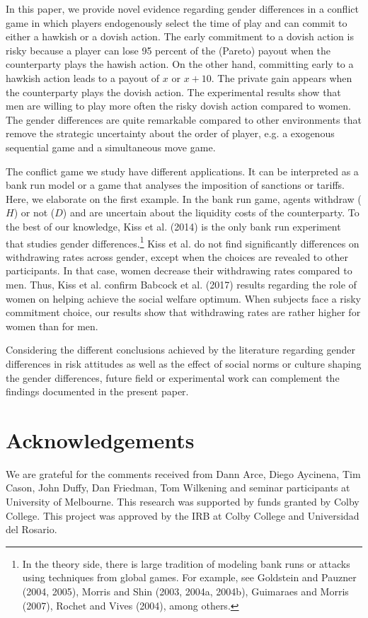 \documentclass[12pt,english]{article}
\begin{document}
In this paper, we provide novel evidence regarding gender differences in a conflict game in which players endogenously select the time of play and can commit to either a hawkish or a dovish action. The early commitment to a dovish action is risky because a player can lose 95 percent of the (Pareto) payout when the counterparty plays the hawish action. On the other hand, committing early to a hawkish action leads to a payout of $x$ or $x+10$. The private gain appears when the counterparty plays the dovish action. The experimental results show that men are willing to play more often the risky dovish action compared to women. The gender differences are quite remarkable compared to other environments that remove the strategic uncertainty about the order of player, e.g. a exogenous sequential game and a simultaneous move game. 

The conflict game we study have different applications. It can be interpreted as a bank run model or a game that analyses the imposition of sanctions or tariffs. Here, we elaborate on the first example. In the bank run game, agents withdraw ($H$) or not ($D$) and are uncertain about the liquidity costs of the counterparty. To the best of our knowledge, Kiss et al. (2014) is the only bank run experiment that studies gender differences.\footnote{In the theory side, there is large tradition of modeling bank runs or attacks using techniques from global games. For example, see Goldstein and Pauzner (2004, 2005), Morris and Shin (2003, 2004a, 2004b), Guimaraes and Morris (2007), Rochet and Vives (2004), among others.} Kiss et al. do not find significantly differences on withdrawing rates across gender, except when the choices are revealed to other participants. In that case, women decrease their withdrawing rates compared to men. Thus, Kiss et al. confirm Babcock et al. (2017) results regarding the role of women on helping achieve the social welfare optimum. When subjects face a risky commitment choice, our results show that withdrawing rates are rather higher for women than for men. 

Considering the different conclusions achieved by the literature regarding gender differences in risk attitudes as well as the effect of social norms or culture shaping the gender differences, future field or experimental work can complement the findings documented in the present paper. 
\section{Acknowledgements}
We are grateful for the comments received from Dann Arce, Diego Aycinena, Tim Cason, John Duffy, Dan Friedman, Tom Wilkening and seminar participants at University of Melbourne. This research was supported by funds granted by Colby College. This project was approved by the IRB at Colby College and Universidad del Rosario.
\end{document}
